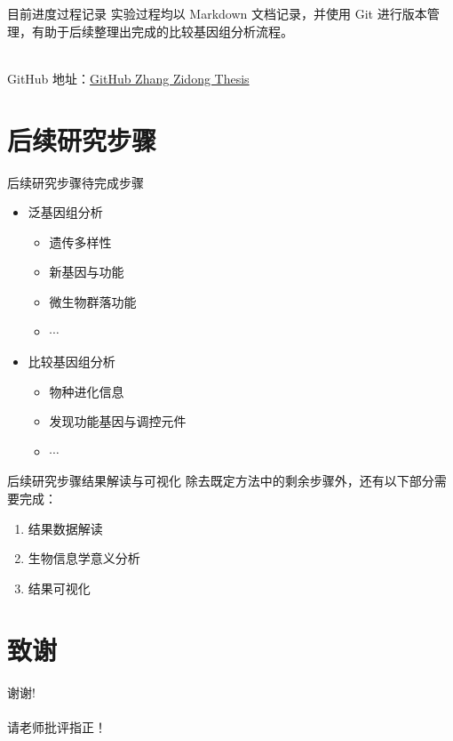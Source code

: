 \documentclass{beamer}
\begin{document}
	\begin{frame}{目前进度}{过程记录}
		\qquad 实验过程均以 Markdown 文档记录，并使用 Git 进行版本管理，有助于后续整理出完成的比较基因组分析流程。

		\quad \\

		GitHub 地址：\href{https://github.com/Bluuur/MarkdownNotes/tree/main/Thesis}{GitHub Zhang Zidong Thesis}
		
	\end{frame}

	\section{后续研究步骤}
	\begin{frame}{后续研究步骤}{待完成步骤}
		\begin{itemize}
			\item 泛基因组分析
			\begin{itemize}
				\item 遗传多样性
				\item 新基因与功能
				\item 微生物群落功能
				\item $\cdots$
			\end{itemize}
			\item 比较基因组分析
			\begin{itemize}
				\item 物种进化信息
				\item 发现功能基因与调控元件
				\item $\cdots$
			\end{itemize}
		\end{itemize}
		
	\end{frame}

	\begin{frame}{后续研究步骤}{结果解读与可视化}
		除去既定方法中的剩余步骤外，还有以下部分需要完成：
		\begin{enumerate}
			\item 结果数据解读
			\item 生物信息学意义分析
			\item 结果可视化
		\end{enumerate}
	\end{frame}

	\section*{致谢}  
	\begin{frame}
		\begin{center}
			\textcolor{myNewColorA}{\huge {谢谢!\\ \quad \\ 请老师批评指正！}}
		\end{center}
	\end{frame}
	
\end{document}
